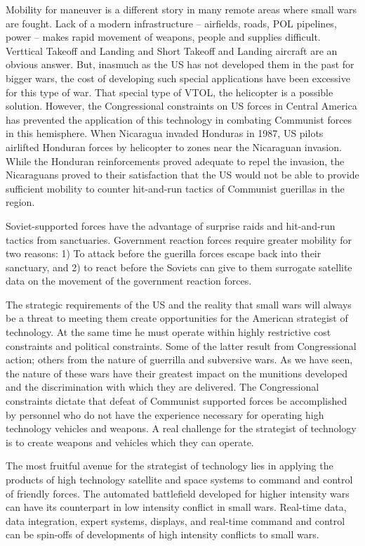 Mobility for maneuver is a different story in many remote areas where small wars are fought. Lack of a modern infrastructure -- airfields, roads, POL pipelines, power -- makes rapid movement of weapons, people and supplies difficult. Verttical Takeoff and Landing and Short Takeoff and Landing aircraft are an obvious answer. But, inasmuch as the US has not developed them in the past for bigger wars, the cost of developing such special applications have been excessive for this type of war. That special type of VTOL, the helicopter is a possible solution. However, the Congressional constraints on US forces in Central America has prevented the application of this technology in combating Communist forces in this hemisphere. When Nicaragua invaded Honduras in 1987, US pilots airlifted Honduran forces by helicopter to zones near the Nicaraguan invasion. While the Honduran reinforcements proved adequate to repel the invasion, the Nicaraguans proved to their satisfaction that the US would not be able to provide sufficient mobility to counter hit-and-run tactics of Communist guerillas in the region.

Soviet-supported forces have the advantage of surprise raids and hit-and-run tactics from sanctuaries. Government reaction forces require greater mobility for two reasons: 1) To attack before the guerilla forces escape back into their sanctuary, and 2) to react before the Soviets can give to them surrogate satellite data on the movement of the government reaction forces.

The strategic requirements of the US and the reality that small wars will always be a threat to meeting them create opportunities for the American strategist of technology. At the same time he must operate within highly restrictive cost constraints and political constraints. Some of the latter result from Congressional action; others from the nature of guerrilla and subversive wars. As we have seen, the nature of these wars have their greatest impact on the munitions developed and the discrimination with which they are delivered. The Congressional constraints dictate that defeat of Communist supported forces be accomplished by personnel who do not have the experience necessary for operating high technology vehicles and weapons. A real challenge for the strategist of technology is to create weapons and vehicles which they can operate.

The most fruitful avenue for the strategist of technology lies in applying the products of high technology satellite and space systems to command and control of friendly forces. The automated battlefield developed for higher intensity wars can have its counterpart in low intensity conflict in small wars. Real-time data, data integration, expert systems, displays, and real-time command and control can be spin-offs of developments of high intensity conflicts to small wars.

